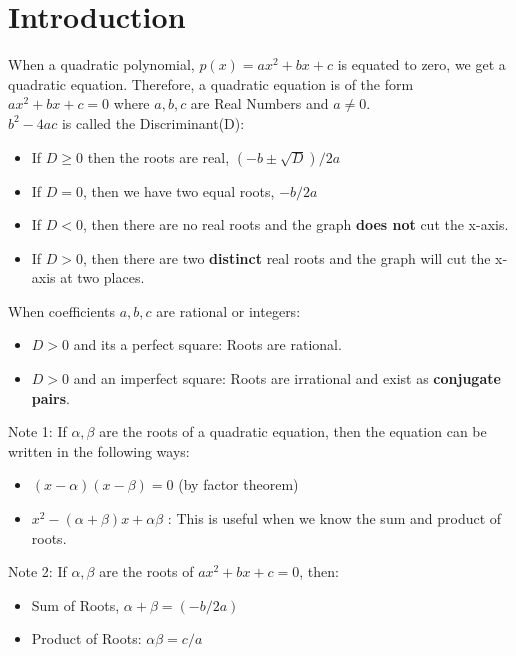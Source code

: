 \documentclass{book}
\begin{document}
	\section{Introduction}
	When a quadratic polynomial, $p(x) = ax^2 + bx + c$ is equated to zero, we get a quadratic equation. Therefore, a quadratic equation is of the form $ax^2 + bx + c = 0$ where $a,b,c$ are Real Numbers and $a \neq 0$. \\
	$b^2 -4ac$ is called the Discriminant(D):
	\begin{itemize}
		\item If $D \ge 0$ then the roots are real, ${(-b \pm \sqrt{D})}/2a$
		\item If $D=0$, then we have two equal roots, $-b/2a$
		\item If $D<0$, then there are no real roots and the graph \textbf{does not} cut the x-axis.
		\item If $D>0$, then there are two \textbf{distinct} real roots and the graph will cut the x-axis at two places.
	\end{itemize}
	
	When coefficients $a,b,c$ are rational or integers:
	\begin{itemize}
		\item $D>0$ and its a perfect square: Roots are rational.
		\item $D>0$ and an imperfect square: Roots are irrational and exist as \textbf{conjugate pairs}.
	\end{itemize}
	
	\begin{mdframed}[backgroundcolor=yellow]
		Note 1: If $\alpha, \beta$ are the roots of a quadratic equation, then the equation can be written in the following ways:
		\begin{itemize}
			\item $(x - \alpha)(x - \beta) = 0$ (by factor theorem)
			\item $x^2 - (\alpha + \beta)x + \alpha\beta$ : This is useful when we know the sum and product of roots.
		\end{itemize}
	\end{mdframed}
	\begin{mdframed}[backgroundcolor=yellow]
		Note 2: If $\alpha, \beta$ are the roots of $ax^2 + bx + c = 0$, then:
		\begin{itemize}
			\item Sum of Roots, $\alpha + \beta = {(-b/2a)}$
			\item Product of Roots: $\alpha\beta = c/a$
		\end{itemize}
	\end{mdframed}
	
\end{document}
